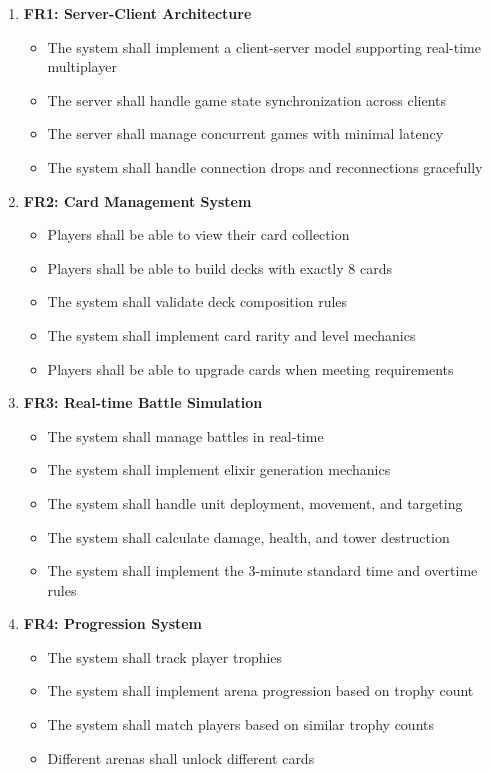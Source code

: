 \documentclass{article}
\begin{document}
\begin{enumerate}
    \item \textbf{FR1: Server-Client Architecture}
    \begin{itemize}
        \item The system shall implement a client-server model supporting real-time multiplayer
        \item The server shall handle game state synchronization across clients
        \item The server shall manage concurrent games with minimal latency
        \item The system shall handle connection drops and reconnections gracefully
    \end{itemize}

    \item \textbf{FR2: Card Management System}
    \begin{itemize}
        \item Players shall be able to view their card collection
        \item Players shall be able to build decks with exactly 8 cards
        \item The system shall validate deck composition rules
        \item The system shall implement card rarity and level mechanics
        \item Players shall be able to upgrade cards when meeting requirements
    \end{itemize}

    \item \textbf{FR3: Real-time Battle Simulation}
    \begin{itemize}
        \item The system shall manage battles in real-time
        \item The system shall implement elixir generation mechanics
        \item The system shall handle unit deployment, movement, and targeting
        \item The system shall calculate damage, health, and tower destruction
        \item The system shall implement the 3-minute standard time and overtime rules
    \end{itemize}

    \item \textbf{FR4: Progression System}
    \begin{itemize}
        \item The system shall track player trophies
        \item The system shall implement arena progression based on trophy count
        \item The system shall match players based on similar trophy counts
        \item Different arenas shall unlock different cards
    \end{itemize}


\end{enumerate}
\end{document}
